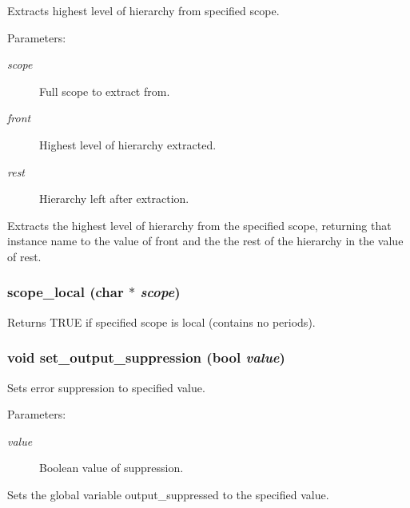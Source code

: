 Extracts highest level of hierarchy from specified scope.

\begin{Desc}
\item[Parameters: ]\par
\begin{description}
\item[{\em 
scope}]Full scope to extract from. \item[{\em 
front}]Highest level of hierarchy extracted. \item[{\em 
rest}]Hierarchy left after extraction.\end{description}
\end{Desc}
Extracts the highest level of hierarchy from the specified scope, returning that instance name to the value of front and the the rest of the hierarchy in the value of rest. 
\subsubsection{ scope\_\-local (char $\ast$ {\em scope})}\label{util_8h_a10}


Returns TRUE if specified scope is local (contains no periods).

\subsubsection{\setlength{\rightskip}{0pt plus 5cm}void set\_\-output\_\-suppression ({\bf bool} {\em value})}\label{util_8h_a0}


Sets error suppression to specified value.

\begin{Desc}
\item[Parameters: ]\par
\begin{description}
\item[{\em 
value}]Boolean value of suppression.\end{description}
\end{Desc}
Sets the global variable output\_\-suppressed to the specified value. 